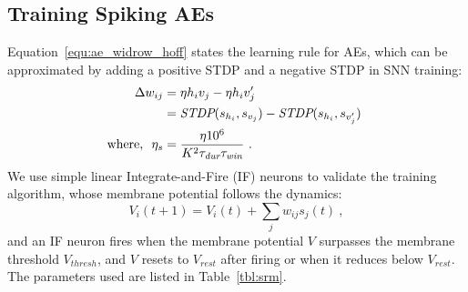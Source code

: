\subsection[Spiking AEs]{Training Spiking AEs}
\label{subsec:exp_SAE}
Equation~\ref{equ:ae_widrow_hoff} states the learning rule for AEs, which can be approximated by adding a positive STDP and a negative STDP in SNN training:
\begin{equation}
\label{equ:sae}
\begin{aligned}
	\Delta w_{ij} &= \eta h_i v_j - \eta h_i v'_j \\
	&= \textit{\textrm{STDP}}(s_{h_i}, s_{v_j}) - \textit{\textrm{STDP}}(s_{h_i}, s_{v'_j})~ \\
	\textrm{where,~~} \eta_{s} &=  \frac{\eta 10^6}{K^2 \tau_{\textit{\textrm{dur}}} \tau_{\textit{\textrm{win}}}}~.
\end{aligned} 
\end{equation}
We use simple linear Integrate-and-Fire (IF) neurons to validate the training algorithm, whose membrane potential follows the dynamics:
\begin{equation}
V_i(t+1)=V_i(t) + \sum_j w_{ij} s_j(t)~,
\end{equation}
and an IF neuron fires when the membrane potential $V$ surpasses the membrane threshold $V_{thresh}$, and $V$ resets to $V_{rest}$ after firing or when it reduces below $V_{rest}$.
The parameters used are listed in Table~\ref{tbl:srm}.

